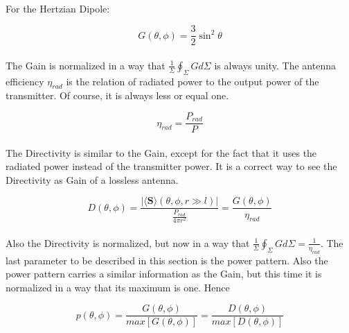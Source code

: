 \documentclass[a4paper,10pt]{thesis}
\begin{document}
\paragraph*{}
For the Hertzian Dipole:

\begin{equation}\label{gain_hd}
G( \theta , \phi )= \frac{3}{2} \sin^2 \theta
\end{equation}

\paragraph*{}
The Gain is normalized in a way that $\frac{1}{\Sigma}\oint_\Sigma G d\Sigma$ is always unity. The antenna efficiency $\eta_{rad}$ is the relation of radiated power to the output power of the transmitter. Of course, it is always less or equal one.

\begin{equation}\label{antenna_efficiency}
\eta_{rad} = \frac{P_{rad}}{P}
\end{equation}

\paragraph*{}
The Directivity is similar to the Gain, except for the fact that it uses the radiated power instead of the transmitter power. It is a correct way to see the Directivity as Gain of a lossless antenna.

\begin{equation}\label{directivity}
D( \theta , \phi )= \frac{| \langle \mathbf{S} \rangle ( \theta , \phi , r\gg l) | } {\frac{P_{rad}}{4\pi r^2}} = \frac{G( \theta , \phi )}{\eta_{rad}}
\end{equation}

\paragraph*{}
Also the Directivity is normalized, but now in a way that  $\frac{1}{\Sigma}\oint_\Sigma G d\Sigma = \frac{1}{\eta_{rad}}$. The last parameter to be described in this section is the power pattern. Also the power pattern carries a similar information as the Gain, but this time it is normalized in a way that its maximum is one. Hence

\begin{equation}\label{power_pattern}
p ( \theta , \phi ) = \frac{G( \theta , \phi )}{max[G( \theta , \phi )]} = \frac{D( \theta , \phi )}{max[D( \theta , \phi )]}
\end{equation}
\end{document}
